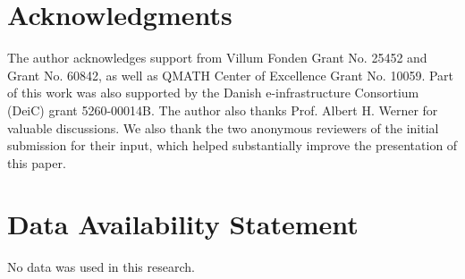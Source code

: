 \documentclass[a4paper]{article}
\numberwithin{equation}{section}   %
\theoremstyle{plain}   %
\theoremstyle{plain}   %
\theoremstyle{examplestyle}
\begin{document}

\section*{Acknowledgments}


    The author acknowledges support from Villum Fonden Grant No. 25452 and Grant No. 60842, as well as QMATH Center of Excellence Grant No. 10059. 
    Part of this work was also supported by the Danish e-infrastructure Consortium (DeiC) grant 5260-00014B. 
    The author also thanks Prof. Albert H. Werner for valuable discussions. 
    We also thank the two anonymous reviewers of the initial submission for their input, which helped substantially improve the presentation of this paper. 


\section*{Data Availability Statement}
\noindent
No data was used in this research.
\end{document}
